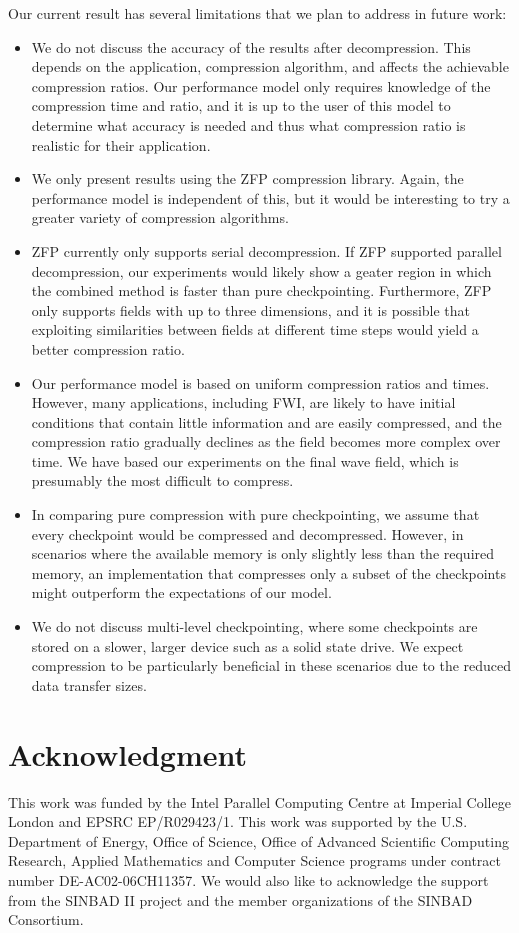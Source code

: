 \documentclass[conference]{IEEEtran}
\begin{document}
Our current result has several limitations that we plan to address in future
work:
\begin{itemize}
\item We do not discuss the accuracy of the results after decompression. This
depends on the application, compression algorithm, and affects the achievable
compression ratios. Our performance model only requires knowledge of the
compression time and ratio, and it is up to the user of this model to determine
what accuracy is needed and thus what compression ratio is realistic for their
application.
\item We only present results using the ZFP compression library. Again, the
performance model is independent of this, but it would be interesting to try a
greater variety of compression algorithms.
\item ZFP currently only supports serial decompression. If ZFP supported
parallel decompression, our experiments would likely show a geater region in
which the combined method is faster than pure checkpointing. Furthermore, ZFP
only supports fields with up to three dimensions, and it is possible that
exploiting similarities between fields at different time steps would yield a
better compression ratio.
\item Our performance model is based on uniform compression ratios and times.
However, many applications, including FWI, are likely to have initial conditions
that contain little information and are easily compressed, and the compression
ratio gradually declines as the field becomes more complex over time. We have
based our experiments on the final wave field, which is presumably the most
difficult to compress.
\item In comparing pure compression with pure checkpointing, we assume that
every checkpoint would be compressed and decompressed. However, in scenarios
where the available memory is only slightly less than the required memory, an
implementation that compresses only a subset of the checkpoints might outperform
the expectations of our model. 
\item We do not discuss multi-level checkpointing, where some checkpoints are
stored on a slower, larger device such as a solid state drive. We expect
compression to be particularly beneficial in these scenarios due to the reduced
data transfer sizes.
\end{itemize}

\section*{Acknowledgment}
This work was funded by the Intel Parallel Computing Centre at
Imperial College London and EPSRC EP/R029423/1. 
This work was supported by the U.S. Department of Energy, Office of Science,
Office of Advanced Scientific Computing Research, Applied Mathematics and
Computer Science programs under contract number DE-AC02-06CH11357.
We would also like to acknowledge the support from the SINBAD II project and
the member organizations of the SINBAD Consortium.
\end{document}
